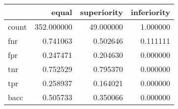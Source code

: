 \begin{tabular}{lrrr}
\toprule
{} &       equal &  superiority &  inferiority \\
\midrule
count &  352.000000 &    49.000000 &     1.000000 \\
fnr   &    0.741063 &     0.502646 &     0.111111 \\
fpr   &    0.247471 &     0.204630 &     0.000000 \\
tnr   &    0.752529 &     0.795370 &     0.000000 \\
tpr   &    0.258937 &     0.164021 &     0.000000 \\
bacc  &    0.505733 &     0.350066 &     0.000000 \\
\bottomrule
\end{tabular}
